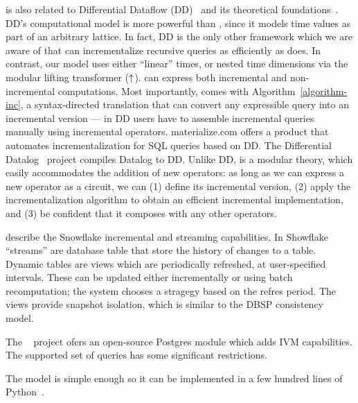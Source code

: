 \dbsp is also related to Differential Dataflow
(DD)~\cite{mcsherry-cidr13,murray-sosp13,chothia-vldb16} and its
theoretical foundations~\cite{abadi-fossacs15}.  DD's computational
model is more powerful than \dbsp, since it models time values as part
of an arbitrary lattice.  In fact, DD is the only other framework
which we are aware of that can incrementalize recursive queries as
efficiently as \dbsp does.  In contrast, our model uses either
``linear'' times, or nested time dimensions via the modular lifting
transformer (${\uparrow}$).  \dbsp can express both incremental and
non-incremental computations.  Most importantly, \dbsp comes with
Algorithm~\ref{algorithm-inc}, a syntax-directed translation that can
convert any expressible query into an incremental version --- in DD
users have to assemble incremental queries manually using incremental
operators.  materialize.com offers a product that automates
incrementalization for SQL queries based on DD.  The Differential
Datalog~\cite{ryzhyk-datalog19} project compiles Datalog to DD.
Unlike DD, \dbsp is a modular theory, which easily accommodates the
addition of new operators: as long as we can express a new operator as
a \dbsp circuit, we can (1) define its incremental version, (2) apply
the incrementalization algorithm to obtain an efficient incremental
implementation, and (3) be confident that it composes with any other
operators.

\cite{akidau-amd23,akidau-debs24} describe the Snowflake incremental
and streaming capabilities.  In Showflake ``streams'' are database
table that store the history of changes to a table.  Dynamic tables
are views which are periodically refreshed, at user-specified
intervals.  These can be updated either incrementally or using batch
recomputation; the system chooses a stragegy based on the refres
period.  The views provide snapshot isolation, which is similar to the
DBSP consistency model.

The ~\cite{pgivm} project ofers an open-source Postgres
module which adds IVM capabilities.  The supported set of queries has
some significant restrictions.

The \dbsp model is simple enough so it can be implemented in a few
hundred lines of Python~\cite{dbsp-python}.
